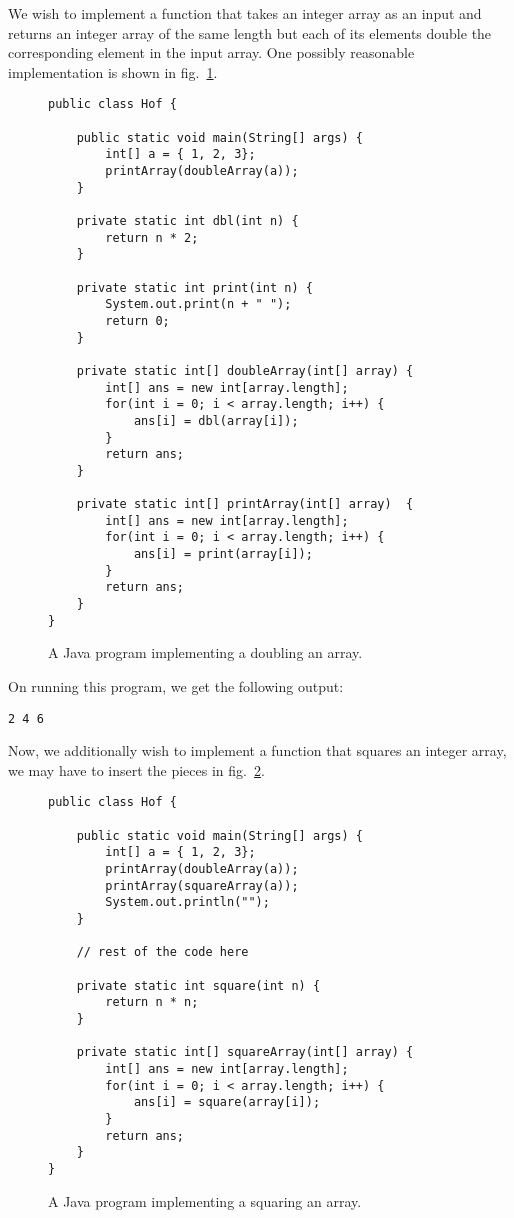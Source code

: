 \documentclass[12pt,a4paper]{article}
\begin{document}
We wish to implement a function that takes an integer array as an input and returns an integer array of the same length but each of its elements double the corresponding element in the input array. One possibly reasonable implementation is shown in fig.~\ref{f:hof1}.
\begin{figure}[H]
\begin{lstlisting}[frame=single]
public class Hof {

	public static void main(String[] args) {
		int[] a = { 1, 2, 3};
		printArray(doubleArray(a));
	}

	private static int dbl(int n) {
		return n * 2;
	}

	private static int print(int n) {
		System.out.print(n + " ");
		return 0;
	}

	private static int[] doubleArray(int[] array) {
		int[] ans = new int[array.length];
		for(int i = 0; i < array.length; i++) {
			ans[i] = dbl(array[i]);
		}
		return ans;
	}

	private static int[] printArray(int[] array)  {
		int[] ans = new int[array.length];
		for(int i = 0; i < array.length; i++) {
			ans[i] = print(array[i]);
		}
		return ans;
	}
}
\end{lstlisting}
\caption{A Java program implementing a doubling an array.}
\label{f:hof1}
\end{figure}

On running this program, we get the following output:
\begin{lstlisting}
2 4 6
\end{lstlisting}

Now, we additionally wish to implement a function that squares an integer array, we may have to insert the pieces in fig.~\ref{f:hof2}.
\begin{figure}[H]
\begin{lstlisting}[frame=single]
public class Hof {

	public static void main(String[] args) {
		int[] a = { 1, 2, 3};
		printArray(doubleArray(a));
		printArray(squareArray(a));
		System.out.println("");
	}

    // rest of the code here
    
	private static int square(int n) {
		return n * n;
	}

	private static int[] squareArray(int[] array) {
		int[] ans = new int[array.length];
		for(int i = 0; i < array.length; i++) {
			ans[i] = square(array[i]);
		}
		return ans;
	}
}
\end{lstlisting}
\caption{A Java program implementing a squaring an array.}
\label{f:hof2}
\end{figure}
\end{document}
